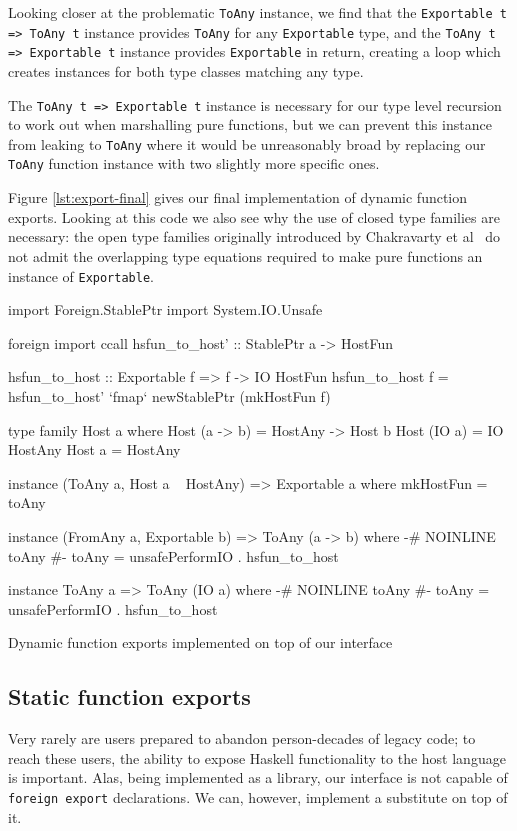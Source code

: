 \documentclass[preprint]{sigplanconf}
\begin{document}
Looking closer at the problematic \lstinline!ToAny! instance, we find that
the \lstinline!Exportable t => ToAny t! instance provides
\lstinline!ToAny! for any \lstinline!Exportable! type, and the
\lstinline!ToAny t => Exportable t! instance provides \lstinline!Exportable! in
return, creating a loop which creates instances for both type classes
matching any type.

The \lstinline!ToAny t => Exportable t! instance is necessary
for our type level recursion to work out when marshalling pure functions,
but we can prevent this instance from leaking to \lstinline!ToAny! where it
would be unreasonably broad by replacing our \lstinline!ToAny! function
instance with two slightly more specific ones.

Figure \ref{lst:export-final} gives our final implementation of dynamic
function exports.
Looking at this code we also see why the use of closed type families are
necessary: the open type families originally introduced by Chakravarty et
al\ \cite{typefamilies} do not admit the overlapping type equations required
to make pure functions an instance of \lstinline!Exportable!.

\begin{listingfloat}
\begin{code}
  import Foreign.StablePtr
  import System.IO.Unsafe

  foreign import ccall
    hsfun_to_host' :: StablePtr a -> HostFun

  hsfun_to_host :: Exportable f => f -> IO HostFun
  hsfun_to_host f =
    hsfun_to_host' `fmap` newStablePtr (mkHostFun f)

  type family Host a where
    Host (a -> b) = HostAny -> Host b
    Host (IO a)   = IO HostAny
    Host a        = HostAny

  instance (ToAny a, Host a ~ HostAny) =>
            Exportable a where
    mkHostFun = toAny

  instance (FromAny a, Exportable b) =>
            ToAny (a -> b) where
    {-# NOINLINE toAny #-}
    toAny = unsafePerformIO . hsfun_to_host

  instance ToAny a => ToAny (IO a) where
    {-# NOINLINE toAny #-}
    toAny = unsafePerformIO . hsfun_to_host
\end{code}
\caption{Dynamic function exports implemented on top of our interface}
\label{lst:export-final}
\end{listingfloat}

\subsection{Static function exports}
\label{sec:exports}
Very rarely are users prepared to abandon person-decades of legacy code;
to reach these users, the ability to expose Haskell functionality to the host
language is important. Alas, being implemented as a library, our interface is
not capable of \lstinline!foreign export! declarations. We can, however,
implement a substitute on top of it.
\end{document}
